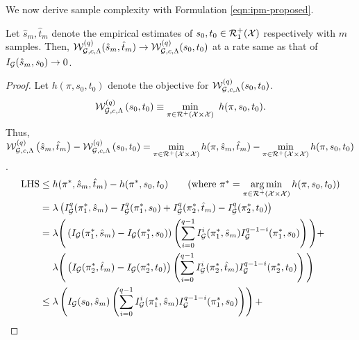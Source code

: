 We now derive sample complexity with Formulation \ref{eqn:ipm-proposed}.
\begin{lemmaBox}
\begin{lemma}
    \label{lemma:sampcomp2} Let $\hat{s}_m,\hat{t}_m$ denote the empirical estimates of $s_0,t_0 \in \mathcal{R}_1^+(\mathcal{X})$ respectively with $m$ samples. Then, $\mathcal{W}_{\mathcal{G}, c, \Lambda}^{(q)}(\hat{s}_m,\hat{t}_m)\rightarrow \mathcal{W}_{\mathcal{G}, c, \Lambda}^{(q)}(s_0,t_0)$ at a rate same as that of $ I_{\mathcal{G}}(\hat{s}_m,s_0)\rightarrow0$.
\end{lemma}
\end{lemmaBox}
\begin{proof}
Let $h(\pi,s_0,t_0)$ denote the objective for $\mathcal{W}_{\mathcal{G}, c, \Lambda}^{(q)}(s_0, t_0)$.
\begin{equation*}\label{eqn:propbaru}
    \mathcal{W}_{\mathcal{G}, c, \Lambda}^{(q)}\left(s_0,t_0\right)\equiv \min\limits_{\pi\in\mathcal{R}^+\left(\mathcal{X}\times\mathcal{X}\right)}\ h(\pi,s_0,t_0).
\end{equation*}
Thus, $\mathcal{W}_{\mathcal{G}, c, \Lambda}^{(q)}\left(\hat{s}_m,\hat{t}_m\right)-\mathcal{W}_{\mathcal{G}, c, \Lambda}^{(q)}\left(s_0,t_0\right) =  \min\limits_{\pi\in\mathcal{R}^+\left(\mathcal{X}\times\mathcal{X}\right)}h(\pi,\hat{s}_m,\hat{t}_m)-\min\limits_{\pi\in\mathcal{R}^+\left(\mathcal{X}\times\mathcal{X}\right)} h(\pi,s_0,t_0)$.
\begingroup
\allowdisplaybreaks
\begin{align*}
    \textup{LHS}&\le h(\pi^*,\hat{s}_m,\hat{t}_m)- h(\pi^*,s_0,t_0)\tag{where $\pi^* = \argmin_{\pi\in\calR^+\left(\calX\times\calX\right)}h(\pi,s_0,t_0)$}\\
    & = \lambda\left( I^q_\calG(\pi^*_1,\hat{s}_m) - I^q_\calG(\pi^*_1,s_0) + 
    I^q_\calG(\pi^*_2,\hat{t}_m) - I^q_\calG(\pi^*_2,t_0) \right)\\
    & = \lambda \Bigg( \left( I_\calG(\pi^*_1,\hat{s}_m) -  I_\calG(\pi^*_1,s_0)\right)
    \left(\sum_{i=0}^{q-1} I^i_\calG(\pi^*_1,\hat{s}_m) I^{q-1-i}_\calG(\pi^*_1,s_0)\right) \Bigg) +\\
    &~\quad \lambda \Bigg ( \left( I_\calG(\pi^*_2,\hat{t}_m) -  I_\calG(\pi^*_2,t_0)\right)\left(\sum_{i=0}^{q-1} I^i_\calG(\pi^*_2,\hat{t}_m) I^{q-1-i}_\calG(\pi^*_2,t_0) \right) \Bigg)\\
    & \le
    \lambda \left(  I_\calG(s_0,\hat{s}_m)\left(\sum_{i=0}^{q-1} I^i_\calG(\pi^*_1,\hat{s}_m) I^{q-1-i}_\calG(\pi^*_1,s_0)\right) \right) +\\

\end{align*}
\end{proof}
